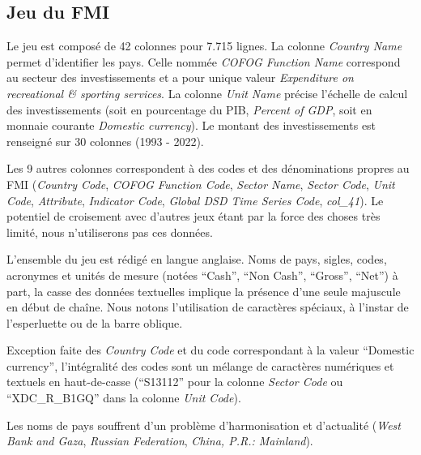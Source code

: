 \documentclass[hidelinks, 12pt]{report}
\begin{document}
%





\subsection{Jeu du FMI}

Le jeu est composé de 42 colonnes pour 7.715 lignes. La colonne \textit{Country Name} permet d'identifier les pays. Celle nommée \textit{COFOG Function Name} correspond au secteur des investissements et a pour unique valeur \textit{Expenditure on recreational \& sporting services}. La colonne \textit{Unit Name} précise l'échelle de calcul des investissements (soit en pourcentage du PIB, \textit{Percent of GDP}, soit en monnaie courante \textit{Domestic currency}). Le montant des investissements est renseigné sur 30 colonnes (1993 - 2022).

Les 9 autres colonnes correspondent à des codes et des dénominations propres au FMI (\textit{Country Code}, \textit{COFOG Function Code}, \textit{Sector Name}, \textit{Sector Code}, \textit{Unit Code}, \textit{Attribute}, \textit{Indicator Code}, \textit{Global DSD Time Series Code}, \textit{col\_41}). Le potentiel de croisement avec d'autres jeux étant par la force des choses très limité, nous n'utiliserons pas ces données.  

L'ensemble du jeu est rédigé en langue anglaise. Noms de pays, sigles, codes, acronymes et unités de mesure (notées \enquote{Cash}, \enquote{Non Cash}, \enquote{Gross}, \enquote{Net}) à part, la casse des données textuelles implique la présence d'une seule majuscule en début de chaîne. Nous notons l'utilisation de caractères spéciaux, à l'instar de l'esperluette ou de la barre oblique.

Exception faite des \textit{Country Code} et du code correspondant à la valeur \enquote{Domestic currency}, l'intégralité des codes sont un mélange de caractères numériques et textuels en haut-de-casse (\enquote{S13112} pour la colonne \textit{Sector Code} ou \enquote{XDC\_R\_B1GQ} dans la colonne \textit{Unit Code}).

Les noms de pays souffrent d'un problème d'harmonisation et d'actualité (\textit{West Bank and Gaza}, \textit{Russian Federation}, \textit{China, P.R.: Mainland}).
\end{document}
